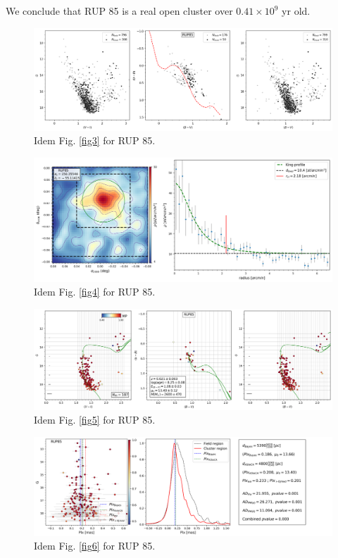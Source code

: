 \documentclass[draft]{aa}
\begin{document}
We conclude that RUP 85 is a real open cluster over $0.41\times10^9$ yr old.

\begin{figure}[ht]
    \centering
    \includegraphics[width=\hsize]{../figs/obs_RUP85.png}
    \caption{Idem Fig. \ref{fig3} for RUP 85.}
    \label{fig7}
\end{figure}

\begin{figure}[ht]
    \centering
    \includegraphics[width=\hsize]{../figs/dmap_rup85.png}
    \caption{Idem Fig. \ref{fig4} for RUP 85.}
    \label{fig8}
\end{figure}

\begin{figure}[ht]
    \centering
    \includegraphics[width=\hsize]{../figs/cmds_rup85.png}
    \caption{Idem Fig. \ref{fig5} for RUP 85.}
    \label{fig9}
\end{figure}

\begin{figure}[ht]
    \centering
    \includegraphics[width=\hsize]{../figs/plx_RUP85.png}
    \caption{Idem Fig. \ref{fig6} for RUP 85.}
    \label{fig10}
\end{figure}
\end{document}
